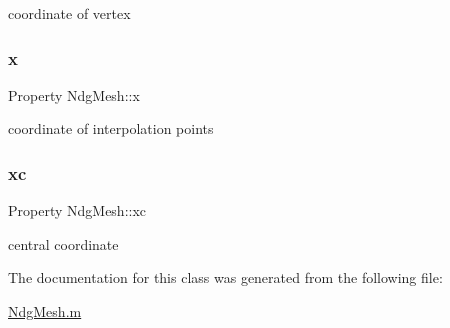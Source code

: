 coordinate of vertex 

\mbox{\label{class_ndg_mesh_a78ce352e49f3a22afb06f1b3a7b41b2e}} 
\subsubsection{\texorpdfstring{x}{x}}
{\footnotesize\ttfamily Property Ndg\+Mesh\+::x\hspace{0.3cm}{\ttfamily [protected]}}



coordinate of interpolation points 

\mbox{\label{class_ndg_mesh_aef3950d7a9b6cc3d77b23ec5bbdd0ad0}} 
\subsubsection{\texorpdfstring{xc}{xc}}
{\footnotesize\ttfamily Property Ndg\+Mesh\+::xc\hspace{0.3cm}{\ttfamily [protected]}}



central coordinate 



The documentation for this class was generated from the following file\+:\begin{DoxyCompactItemize}
\item 
\hyperlink{_ndg_mesh_8m}{Ndg\+Mesh.\+m}\end{DoxyCompactItemize}
